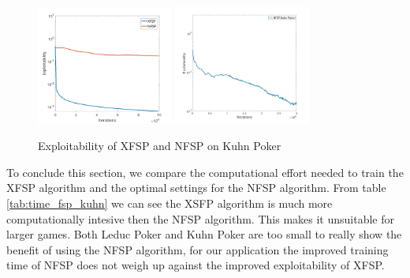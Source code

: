 \documentclass[10pt,a4paper]{article}
\begin{document}
\begin{figure}[h]
\label{fig:nfsp_xfsp_kuhn}
\centering
\includegraphics[width=0.4\textwidth]{Figures/xfsp_nfsp_kuhn.png}
\includegraphics[width=0.4\textwidth]{Figures/kuhn_full_run.jpg}
\caption{Exploitability of XFSP and NFSP on Kuhn Poker}
\end{figure}



To conclude this section, we compare the computational effort needed to train the XFSP algorithm and the optimal settings for the NFSP algorithm. From table \ref{tab:time_fsp_kuhn} we can see the XSFP algorithm is much more computationally intesive then the NFSP algorithm. This makes it unsuitable for larger games. Both Leduc Poker and Kuhn Poker are too small to really show the benefit of using the NFSP algorithm, for our application the improved training time of NFSP does not weigh up against the improved exploitability of XFSP.
\end{document}
